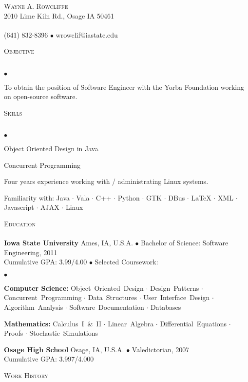 \documentclass{article}
\newcommand{\lineunder} {
	\vspace*{-8pt} \\ \hspace*{-18pt} \hrulefill \\
}
\newcommand{\header}[1] {
	{\hspace*{-15pt}\vspace*{6pt} \textsc{#1}} \vspace*{-6pt} \lineunder
}
\newcommand{\contact}[3] {
	\vspace*{-8pt}\begin{center}{\LARGE \scshape {#1}}\\#2 \lineunder#3\end{center}\vspace*{-8pt}
}
\newenvironment{achievements} {
	\begin{list}{$\bullet$}
		{\topsep 0pt \itemsep -2pt}
	}{
		\vspace*{4pt}\end{list}
	}
\newcommand{\schoolwithcourses}[4]{
	\textbf{#1} #2 $\bullet$ #3\\
	#4 $\bullet$  Selected Coursework:\\
	\vspace*{5pt}
}
\newcommand{\school}[4] {
	\textbf{#1} #2 $\bullet$ #3\\
	#4 \\
	\vspace*{5pt}
}
\newcommand{\area}[1] {\textbf{#1:}}
\newcommand{\subject}[1] {\mbox{#1} $\cdot$}
\newcommand{\lastsubject}[1] {\mbox{#1}}
\begin{document}
\small
\smallskip
\vspace*{-44pt}

\contact{Wayne A. Rowcliffe}
{2010 Lime Kiln Rd., Osage IA 50461}
{(641) 832-8396 $\bullet$ wrowclif@iastate.edu}%

\header{Objective}
	\begin{achievements}
		\item{To obtain the position of Software Engineer with the Yorba Foundation working on open-source software.}
	\end{achievements}

\header{Skills}

	\begin{achievements}
		\item{Object Oriented Design in Java}
		\item{Concurrent Programming}
		\item{Four years experience working with / administrating Linux systems.}
		\item{Familiarity with:
			\subject{Java}
			\subject{Vala}
			\subject{C++}
			\subject{Python}
			\subject{GTK}
			\subject{DBus}
			\subject{\LaTeX{}}
			\subject{XML}
			\subject{Javascript}
			\subject{AJAX}
			\lastsubject{Linux}
		}

	\end{achievements}

\header{Education}

	\schoolwithcourses{Iowa State University}{Ames, IA, U.S.A.}{Bachelor of Science: Software Engineering, 2011}
	{Cumulative GPA: 3.99/4.00}
		\begin{achievements}
			\item{
				\area{Computer Science}
				\subject{Object Oriented Design}
				\subject{Design Patterns}
				\subject{Concurrent Programming}
				\subject{Data Structures}
				\subject{User Interface Design}
				\subject{Algorithm Analysis}
				\subject{Software Documentation}
				\lastsubject{Databases}
			}
			\item{
				\area{Mathematics}
				\subject{Calculus I \& II}
				\subject{Linear Algebra}
				\subject{Differential Equations}
				\subject{Proofs}
				\lastsubject{Stochastic Simulations}
			}
		\end{achievements}

	\school{Osage High School}{Osage, IA, U.S.A.}{Valedictorian, 2007}
	{Cumulative GPA: 3.997/4.000}

\header{Work History}
\end{document}
